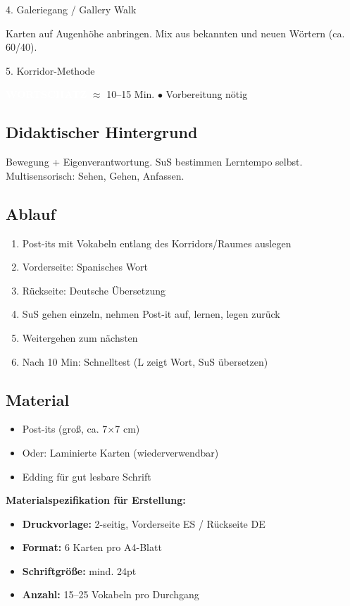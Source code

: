 \documentclass[11pt, a4paper]{article}
\newcommand{\tagWortschatz}{\colorbox{wortschatz}{\textcolor{white}{\footnotesize\textbf{WORTSCHATZ}}}}
\newcommand{\zeit}[1]{\textcolor{grau}{\footnotesize $\approx$ #1 Min.}}
\newcommand{\matVorbereitung}{\textcolor{akzent}{$\bullet$ Vorbereitung nötig}}
\begin{document}
\begin{methode}{4. Galeriegang / Gallery Walk}
\begin{tipp}
Karten auf Augenhöhe anbringen. Mix aus bekannten und neuen Wörtern (ca. 60/40).
\end{tipp}

\end{methode}

\vspace{1em}

\begin{methode}{5. Korridor-Methode}

\tagWortschatz{} \zeit{10--15} \hfill \matVorbereitung

\subsection*{Didaktischer Hintergrund}
Bewegung + Eigenverantwortung. SuS bestimmen Lerntempo selbst. Multisensorisch: Sehen, Gehen, Anfassen.

\subsection*{Ablauf}
\begin{enumerate}[leftmargin=*]
    \item Post-its mit Vokabeln entlang des Korridors/Raumes auslegen
    \item Vorderseite: Spanisches Wort
    \item Rückseite: Deutsche Übersetzung
    \item SuS gehen einzeln, nehmen Post-it auf, lernen, legen zurück
    \item Weitergehen zum nächsten
    \item Nach 10 Min: Schnelltest (L zeigt Wort, SuS übersetzen)
\end{enumerate}

\subsection*{Material}
\begin{materialbox}
\begin{itemize}[label=$\square$, leftmargin=*]
    \item Post-its (groß, ca. 7$\times$7 cm)
    \item Oder: Laminierte Karten (wiederverwendbar)
    \item Edding für gut lesbare Schrift
\end{itemize}

\textbf{Materialspezifikation für Erstellung:}
\begin{itemize}[leftmargin=*]
    \item \textbf{Druckvorlage:} 2-seitig, Vorderseite ES / Rückseite DE
    \item \textbf{Format:} 6 Karten pro A4-Blatt
    \item \textbf{Schriftgröße:} mind. 24pt
    \item \textbf{Anzahl:} 15--25 Vokabeln pro Durchgang
\end{itemize}
\end{materialbox}


\end{methode}
\end{document}
